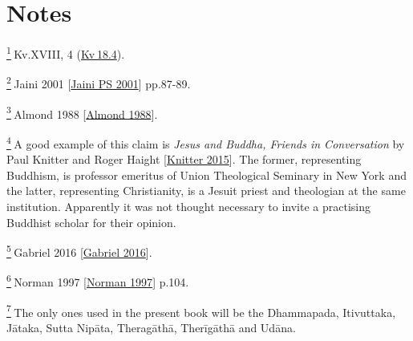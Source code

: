 \label{footprints_split_024.html}{}

\label{footprints_split_024.html_footnotes}
\section{Notes}\label{footprints_split_024.html_calibre_toc_26}

\label{footprints_split_024.html_fn1}
\hyperref[footprints_split_005.htmlux5cux23fnref1]{\textsuperscript{1}} Kv.XVIII,
4 (\href{https://suttacentral.net/kv18.4}{Kv 18.4}).

\label{footprints_split_024.html_fn2}
\hyperref[footprints_split_005.htmlux5cux23fnref2]{\textsuperscript{2}} {Jaini
2001
{{[}\hyperref[footprints_split_022.htmlux5cux23Jainiux5cux2520PSux5cux25202001]{Jaini
PS 2001}{]}}} pp.87-89.

\label{footprints_split_024.html_fn3}
\hyperref[footprints_split_005.htmlux5cux23fnref3]{\textsuperscript{3}} {Almond
1988
{{[}\hyperref[footprints_split_023.htmlux5cux23Almondux5cux25201988]{Almond
1988}{]}}}.

\label{footprints_split_024.html_fn4}
\hyperref[footprints_split_005.htmlux5cux23fnref4]{\textsuperscript{4}} A
good example of this claim is \emph{Jesus and Buddha, Friends in
Conversation} by {Paul Knitter and Roger Haight
{{[}\hyperref[footprints_split_023.htmlux5cux23Knitterux5cux25202015]{Knitter
2015}{]}}}. The former, representing Buddhism, is professor emeritus of
Union Theological Seminary in New York and the latter, representing
Christianity, is a Jesuit priest and theologian at the same institution.
Apparently it was not thought necessary to invite a practising Buddhist
scholar for their opinion.

\label{footprints_split_024.html_fn5}
\hyperref[footprints_split_005.htmlux5cux23fnref5]{\textsuperscript{5}} {Gabriel
2016
{{[}\hyperref[footprints_split_023.htmlux5cux23Gabrielux5cux25202016]{Gabriel
2016}{]}}}.

\label{footprints_split_024.html_fn6}
\hyperref[footprints_split_005.htmlux5cux23fnref6]{\textsuperscript{6}} {Norman
1997
{{[}\hyperref[footprints_split_022.htmlux5cux23Normanux5cux25201997]{Norman
1997}{]}}} p.104.

\label{footprints_split_024.html_fn7}
\hyperref[footprints_split_005.htmlux5cux23fnref7]{\textsuperscript{7}} The
only ones used in the present book will be the Dhammapada, Itivuttaka,
Jātaka, Sutta Nipāta, Theragāthā, Therīgāthā and Udāna.

